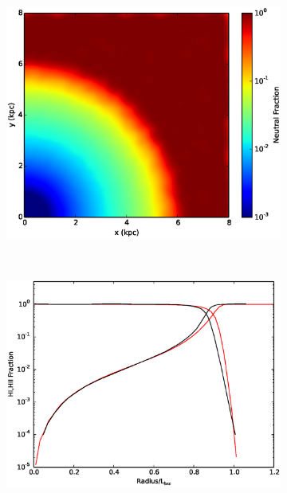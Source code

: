 \begin{figure}
        \centering
        \begin{subfigure}[b]{0.45\textwidth}
                \includegraphics[width=\textwidth]{graphics/ifront6401000slice.eps}
                \caption{}
                \label{fig:stromgrenisoslice}
        \end{subfigure}
        ~
        \begin{subfigure}[b]{0.45\textwidth}
                \includegraphics[width=\textwidth]{graphics/ifront6401000HI.eps}
                \caption{}
                \label{fig:stromgrenisoHI}

\end{subfigure}
\end{figure}
